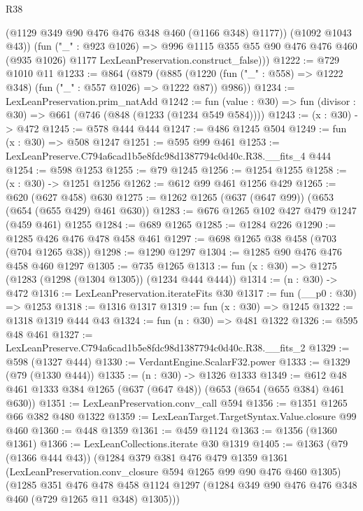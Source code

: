 \begin{lexlean}{R38}
\begin{coremodule}
            (@1129 @349 @90 @476 @476 @348 @460 (@1166 @348) @1177))
          (@1092 @1043 @43))
        (fun ("_" : @923 @1026) =>
        @996
          @1115
          @355
          @55
          @90
          @476
          @476
          @460
          (@935 @1026)
          @1177
          LexLeanPreservation.construct_false)))
@1222 := @729 @1010 @11
@1233 := @864
    (@879
      (@885 (@1220 (fun ("_" : @558) => @1222 @348) (fun ("_" : @557 @1026) => @1222 @87)) @986))
@1234 := LexLeanPreservation.prim_natAdd
@1242 := fun (value : @30) => fun (divisor : @30) => @661 (@746 (@848 (@1233 (@1234 @549 @584))))
@1243 := (x : @30) -> @472
@1245 := @578 @444 @444
@1247 := @486 @1245 @504
@1249 := fun (x : @30) => @508 @1247
@1251 := @595 @99 @461
@1253 := LexLeanPreserve.C794a6cad1b5e8fdc98d1387794c0d40c.R38.__fits_4 @444
@1254 := @598 @1253
@1255 := @79 @1245
@1256 := @1254 @1255
@1258 := (x : @30) -> @1251 @1256
@1262 := @612 @99 @461 @1256 @429
@1265 := @620 (@627 @458) @630
@1275 := @1262 @1265 (@637 (@647 @99)) (@653 (@654 (@655 @429) @461 @630))
@1283 := @676 @1265 @102 @427 @479 @1247 (@459 @461) @1255
@1284 := @689 @1265
@1285 := @1284 @226
@1290 := @1285 @426 @476 @478 @458 @461
@1297 := @698 @1265 @38 @458 (@703 (@704 @1265 @38))
@1298 := @1290 @1297
@1304 := @1285 @90 @476 @476 @458 @460 @1297
@1305 := @735 @1265
@1313 := fun (x : @30) => @1275 (@1283 (@1298 (@1304 @1305)) (@1234 @444 @444))
@1314 := (n : @30) -> @472
@1316 := LexLeanPreservation.iterateFits @30
@1317 := fun (__p0 : @30) => @1253
@1318 := @1316 @1317
@1319 := fun (x : @30) => @1245
@1322 := @1318 @1319 @444 @43
@1324 := fun (n : @30) => @481 @1322
@1326 := @595 @48 @461
@1327 := LexLeanPreserve.C794a6cad1b5e8fdc98d1387794c0d40c.R38.__fits_2
@1329 := @598 (@1327 @444)
@1330 := VerdantEngine.ScalarF32.power
@1333 := @1329 (@79 (@1330 @444))
@1335 := (n : @30) -> @1326 @1333
@1349 := @612 @48 @461 @1333 @384 @1265 (@637 (@647 @48)) (@653 (@654 (@655 @384) @461 @630))
@1351 := LexLeanPreservation.conv_call @594
@1356 := @1351 @1265 @66 @382 @480 @1322
@1359 := LexLeanTarget.TargetSyntax.Value.closure @99 @460
@1360 := @448 @1359
@1361 := @459 @1124
@1363 := @1356 (@1360 @1361)
@1366 := LexLeanCollections.iterate @30 @1319
@1405 := @1363
    (@79 (@1366 @444 @43))
    (@1284
      @379
      @381
      @476
      @479
      @1359
      @1361
      (LexLeanPreservation.conv_closure @594 @1265 @99 @90 @476 @460 @1305)
      (@1285
        @351
        @476
        @478
        @458
        @1124
        @1297
        (@1284 @349 @90 @476 @476 @348 @460 (@729 @1265 @11 @348) @1305)))

\end{coremodule}
\end{lexlean}
